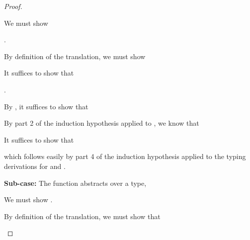 {\begin{proof}
\begin{proofcases}
\begin{proofcases}
    We must show

    \im{\cpstyjudg{\slenv^+}{(\sfune{\sx}{\sA}{\se})^\div}{(\spity{\sx}{\sA}{\sB})^\div}}.

    By definition of the translation, we must show

    \im{\cpstyjudg{\slenv^+}{
        \begin{stackTL}
          \cpsfune{\cpsalpha}{\cpsstarty}{\cpsfune{\cpsk}{\cpsfunty{(\cpspity{\cpsx}{\sA^\div}{\sB^{\div}})}{\cpsalpha}}
            {\\\quad(\cpsappe{\cpsk}{(\cpsfune{\cpsx}{\sA^\div}{\se^\div})})}}}
        {\cpspity{\cpsalpha}{\cpsstarty}{
            \cpsfunty{(\cpsfunty{\cpspity{\cpsx}{\sA^\div}{\sB^\div}}{\cpsalpha})}{\cpsalpha}}}
        \end{stackTL}
      }

    It suffices to show that

    \im{\cpstyjudg{\slenv^+,\cpsalpha:\cpsstarty,
        \cpsk:\cpsfunty{\cpspity{\cpsx}{\sA^\div}{\sB^{\div}}}{\cpsalpha}}
      {\cpsappe{\cpsk}{(\cpsfune{\cpsx}{\sA^\div}{\se^\div})}}{\cpsalpha}}.

    By , it suffices to show that

    \im{\cpstyjudg{\slenv^+,\cpsalpha:\cpsstarty,
        \cpsk:\cpsfunty{\cpspity{\cpsx}{\sA^\div}{\sB^{\div}}}{\cpsalpha}}
      {(\cpsfune{\cpsx}{\sA^\div}{\se^\div})}{\cpspity{\cpsx}{\sA^\div}{\sB^{\div}}}}

    By part 2 of the induction hypothesis applied to
    \im{\styjudg{\slenv,\sx:\sA}{\se}{\sB}}, we know that

    \im{\cpstyjudg{\slenv^+,\cpsx:\sA^\div}{\se^\div}{\sB^\div}}

    It suffices to show that

    \im{\cpswf{\slenv^+,\cpsalpha:\cpsstarty,
        \cpsk:\cpsfunty{\cpspity{\cpsx}{\sA^\div}{\sB^{\div}}}{\cpsalpha}}}
    which follows easily by part 4 of the induction hypothesis applied to the typing derivations for
    \im{\sA} and \im{\sB}.

    \item[{\bfseries Sub-case:}] The function abstracts over a type,
    \im{\styjudg{\slenv}{\sfune{\salpha}{\sK}{\se}}{\spity{\salpha}{\sK}{\sB}}}

    We must show
    \im{\cpstyjudg{\slenv^+}{(\sfune{\salpha}{\sK}{\se})^\div}
      {(\spity{\salpha}{\sK}{\sB})^\div}}.

    By definition of the translation, we must show that


\end{proofcases}
\end{proofcases}
\end{proof}}
